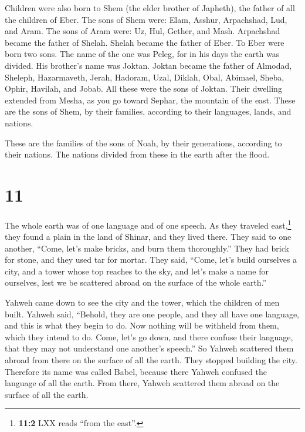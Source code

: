  Children were also born to Shem (the elder brother of
Japheth), the father of all the children of Eber.  The
sons of Shem were: Elam, Asshur, Arpachshad, Lud, and Aram.
 The sons of Aram were: Uz, Hul, Gether, and Mash.
 Arpachshad became the father of Shelah. Shelah became
the father of Eber.  To Eber were born two sons. The name
of the one was Peleg, for in his days the earth was divided. His
brother's name was Joktan.  Joktan became the father of
Almodad, Sheleph, Hazarmaveth, Jerah,  Hadoram, Uzal,
Diklah,  Obal, Abimael, Sheba,  Ophir,
Havilah, and Jobab. All these were the sons of Joktan. 
Their dwelling extended from Mesha, as you go toward Sephar, the
mountain of the east.  These are the sons of Shem, by
their families, according to their languages, lands, and nations.

 These are the families of the sons of Noah, by their
generations, according to their nations. The nations divided from these
in the earth after the flood.

\hypertarget{section-10}{%
\section{11}\label{section-10}}

 The whole earth was of one language and of one speech.
 As they traveled east,\footnote{\textbf{11:2} LXX reads
  ``from the east''.} they found a plain in the land of Shinar, and they
lived there.  They said to one another, ``Come, let's make
bricks, and burn them thoroughly.'' They had brick for stone, and they
used tar for mortar.  They said, ``Come, let's build
ourselves a city, and a tower whose top reaches to the sky, and let's
make a name for ourselves, lest we be scattered abroad on the surface of
the whole earth.''

 Yahweh came down to see the city and the tower, which the
children of men built.  Yahweh said, ``Behold, they are
one people, and they all have one language, and this is what they begin
to do. Now nothing will be withheld from them, which they intend to do.
 Come, let's go down, and there confuse their language,
that they may not understand one another's speech.''  So
Yahweh scattered them abroad from there on the surface of all the earth.
They stopped building the city.  Therefore its name was
called Babel, because there Yahweh confused the language of all the
earth. From there, Yahweh scattered them abroad on the surface of all
the earth.

